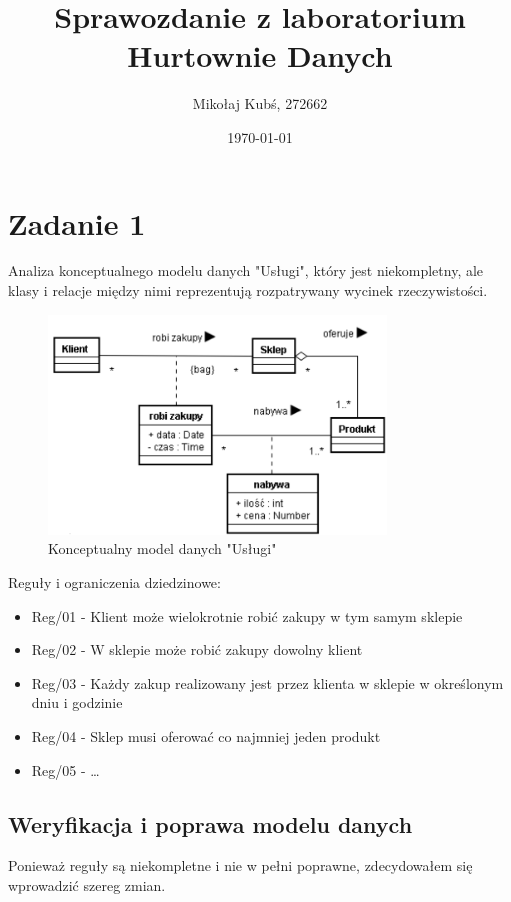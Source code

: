 \documentclass[a4paper,12pt]{article}
\title{Sprawozdanie z laboratorium Hurtownie Danych}
\author{Mikołaj Kubś, 272662}
\date{\today}
\begin{document}
\maketitle

\section{Zadanie 1}
Analiza konceptualnego modelu danych "Usługi", który jest niekompletny,
ale klasy i relacje między nimi reprezentują rozpatrywany wycinek rzeczywistości. 

\begin{figure}[h!]
\centering
\includegraphics[width=0.8\textwidth]{images/image1.png}
\caption{Konceptualny model danych "Usługi"}
\label{fig:uslugi}
\end{figure}

Reguły i ograniczenia dziedzinowe:
\begin{itemize}
    \item Reg/01 - Klient może wielokrotnie robić zakupy w tym samym sklepie
    \item Reg/02 - W sklepie może robić zakupy dowolny klient
    \item Reg/03 - Każdy zakup realizowany jest przez klienta w sklepie w określonym dniu i godzinie
    \item Reg/04 - Sklep musi oferować co najmniej jeden produkt
    \item Reg/05 - \ldots
\end{itemize}

\subsection{Weryfikacja i poprawa modelu danych}

Ponieważ reguły są niekompletne i nie w pełni poprawne, zdecydowałem się wprowadzić szereg zmian. 
\end{document}
